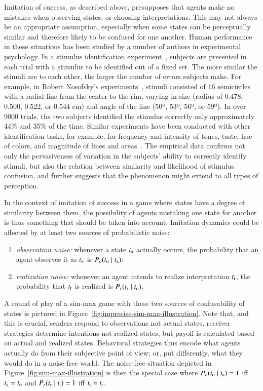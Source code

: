 \documentclass[fleqn,reqno,10pt]{article}
\begin{document}
Imitation of success, as described above, presupposes that agents make no mistakes when
observing states, or choosing interpretations. This may not always be an appropriate
assumption, especially when some states can be perceptually similar and therefore likely to be
confused for one another.
Human performance in these situations has been studied by a number of authors in experimental psychology. %
In a stimulus identification experiment~\citep{luce_detection_1963}, subjects are presented in each trial with a stimulus to be identified out of a fixed set.
The more similar the stimuli are to each other, the larger the number of errors subjects make.
For example, in Robert Nosofsky's experiments~\citep{Nosofsky1986:Attention-Simil}, stimuli consisted of 16 semicircles with a radial line from the center to the rim, varying in size (radius of 0.478, 0.500, 0.522, or 0.544 cm) and angle of the line (50º, 53º, 56º, or 59º).
In over 9000 trials, the two subjects identified the stimulus correctly only approximately 44\% and 35\% of the time.
Similar experiments have been conducted with other identification tasks, for example, for frequency and intensity of tones, taste, hue of colors, and magnitude of lines and areas~\citep{donkin_why_2015}.
The empirical data confirms not only the pervasiveness of variation in the subjects' ability to correctly identify stimuli, but also the relation between similarity and likelihood of stimulus confusion, and further suggests that the phenomenon might extend to all types of perception.

In the context of imitation of success in a game where states have a degree of similarity between them, the possibility of agents mistaking one state for another is thus something that should be taken into account.
Imitation dynamics could be affected by at least two sources of probabilistic noise:

\begin{enumerate}
\item \emph{observation noise:} whenever a state $t_{\mathrm{a}}$ actually occurs, the probability
  that an agent observes it as $t_{\mathrm{o}}$ is $P_o(t_{\mathrm{o}} \mid t_{\mathrm{a}})$;
\item \emph{realization noise:} whenever an agent intends to realize interpretation
  $t_{\mathrm{i}}$, the probability that $t_{\mathrm{r}}$ is realized is
  $P_r(t_{\mathrm{r}} \mid t_{\mathrm{o}})$.
\end{enumerate}

\noindent A round of play of a sim-max game with these two sources of confusability of states
is pictured in Figure~\ref{fig:imprecise-sim-max-illustration}. Note that, and this is crucial,
senders respond to observations not actual states, receiver strategies determine intentions not
realized states, but payoff is calculated based on actual and realized states. Behavioral
strategies thus encode what agents actually do from their subjective point of view; or, put
differently, what they would do in a noise-free world. The noise-free situation depicted in
Figure~\ref{fig:sim-max-illustration} is then the special case where
$P_o(t_{\mathrm{o}} \mid t_{\mathrm{a}}) = 1$ iff $t_{\mathrm{a}} = t_{\mathrm{o}}$ and
$P_r(t_{\mathrm{r}} \mid t_{\mathrm{i}}) = 1$ iff $t_{\mathrm{i}} = t_{\mathrm{r}}$.
\end{document}
